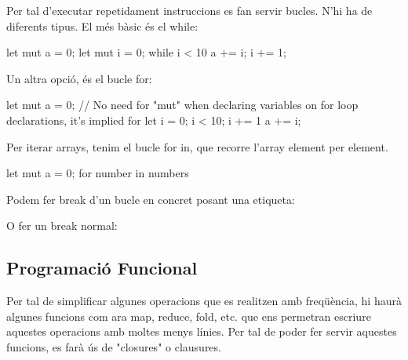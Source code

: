 ﻿\documentclass{article}
\begin{document}
Per tal d'executar repetidament instruccions es fan servir bucles. N'hi ha de
diferents tipus. El més bàsic és el while:

\begin{code}
let mut a = 0;
let mut i = 0;
while i < 10 {
    a += i;
    i += 1;
}
\end{code}

Un altra opció, és el bucle for:

\begin{code}
let mut a = 0;
// No need for "mut" when declaring variables on for loop declarations, it's implied
for let i = 0; i < 10; i += 1 {
    a += i;
}
\end{code}

Per iterar arrays, tenim el bucle for in, que recorre l'array element per element.

\begin{code}
let mut a = 0;
for number in numbers {

}
\end{code}


Podem fer break d'un bucle en concret posant una etiqueta:


O fer un break normal:


\subsection{Programació Funcional}

Per tal de simplificar algunes operacions que es realitzen amb freqüència, hi
haurà algunes funcions com ara map, reduce, fold, etc. que ens permetran
escriure aquestes operacions amb moltes menys línies. Per tal de poder fer servir
aquestes funcions, es farà ús de "closures" o clausures.

\end{document}
